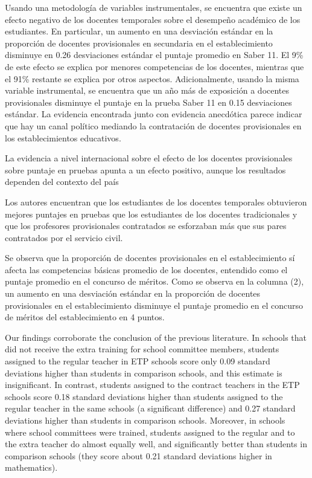 Usando una metodología de variables instrumentales, se encuentra que existe un efecto negativo de los docentes temporales sobre el desempeño académico de los estudiantes. En particular, un aumento en una desviación estándar en la proporción de docentes provisionales en secundaria en el establecimiento disminuye en 0.26 desviaciones estándar el puntaje promedio en Saber 11. El 9\% de este efecto se explica por menores competencias de los docentes, mientras que el 91\% restante se explica por otros aspectos. Adicionalmente, usando la misma variable instrumental, se encuentra que un año más de exposición a docentes provisionales disminuye el puntaje en la prueba Saber 11 en 0.15 desviaciones estándar. La evidencia encontrada junto con evidencia anecdótica parece indicar que hay un canal político mediando la contratación de docentes provisionales en los establecimientos educativos. \citep{Ayala_2017}


La evidencia a nivel internacional sobre el efecto de los docentes provisionales sobre puntaje en pruebas apunta a un efecto positivo, aunque los resultados dependen del contexto del país \citep{Duflo_et_al_2015; Muralidharan_et_al_2013; Ayala_2017}


Los autores encuentran que los estudiantes de los docentes temporales obtuvieron mejores puntajes en pruebas que los estudiantes de los docentes tradicionales y que los profesores provisionales contratados se esforzaban más que sus pares contratados por el servicio civil.
\citep{Duflo_et_al_2015}


Se observa que la proporción de docentes provisionales en el establecimiento sí afecta las
competencias básicas promedio de los docentes, entendido como el puntaje promedio en el concurso de méritos. Como se observa en la columna (2), un aumento en una desviación estándar en la proporción de docentes provisionales en el establecimiento disminuye el puntaje promedio en el concurso de méritos del establecimiento en 4 puntos. \citep{Ayala_2017}


Our findings corroborate the conclusion of the previous literature. In schools that did not receive the extra training for school committee members, students assigned to the regular teacher in ETP schools score only 0.09 standard deviations higher than students in comparison schools, and this estimate is insignificant. In contrast, students assigned to the contract teachers in the ETP schools score 0.18 standard deviations higher than students assigned to the regular teacher in the same schools (a significant difference) and 0.27 standard deviations higher than students in comparison schools. Moreover, in schools where school committees were trained, students assigned to the regular and to the extra teacher do almost
equally well, and significantly better than students in comparison schools (they score about 0.21 standard deviations higher in mathematics). \citep{Duflo_et_al_2009}



